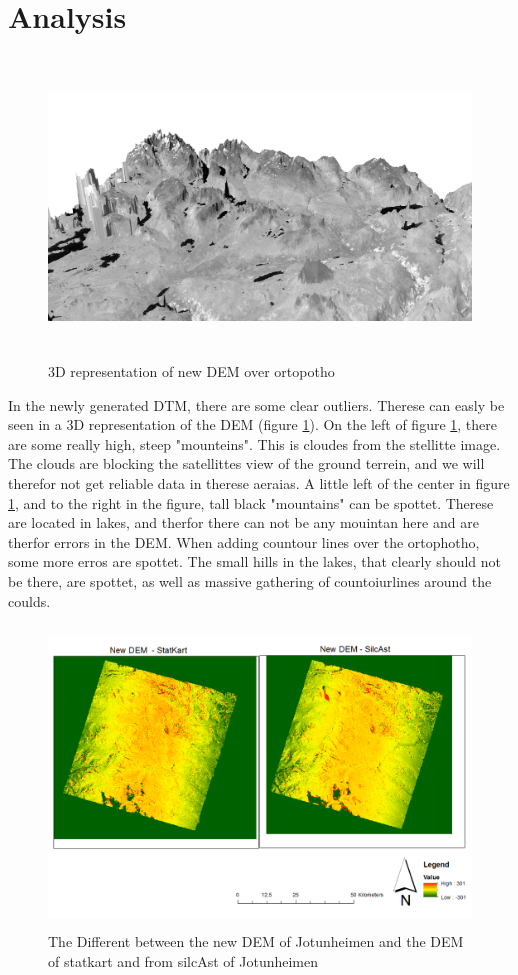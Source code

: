 \documentclass[a4paper,UKenglish]{article}
\begin{document}
\section{Analysis}

\begin{figure}
	\includegraphics[height=8cm]{3dbilde2}
	\caption{3D representation of new DEM over ortopotho}
	\label{3dimage}
\end{figure}

In the newly generated DTM, there are some clear outliers. Therese can easly be seen in a 3D representation of the DEM (figure \ref{3dimage}). On the left of figure \ref{3dimage}, there are some really high, steep "mounteins". This is cloudes from the stellitte image. The clouds are blocking the satellittes view of the ground terrein, and we will therefor not get reliable data in therese aeraias. A little left of the center in figure \ref{3dimage}, and to the right in the figure, tall black "mountains" can be spottet. Therese are located in lakes, and therfor there can not be any mouintan here and are therfor errors in the DEM. When adding countour lines over the ortophotho, some more erros are spottet. The small hills in the lakes, that clearly should not be there, are spottet, as well as massive gathering of countoiurlines around the coulds.

\begin{figure}
	\includegraphics[height=8cm]{DiffJotun-StatogSil}
	\caption{The Different between the new DEM of Jotunheimen and the DEM of statkart and from silcAst of Jotunheimen}
\end{figure}
\end{document}
